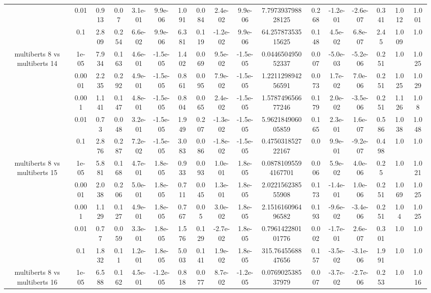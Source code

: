 \begin{tabular}{|c|c|c|c|c|c|c|c|c|c|c|c|c|c|c|c|c|}
 & 0.01 & 0.913 & 0.07 & 3.1e-01 & 9.9e-06 & 1.091 & 0.084 & 2.4e-02 & 9.9e-06 & 7.797393798828125 & 0.268 & -1.2e-01 & -2.6e-07 & 0.341 & 1.012 & 1.001 \\
 & 0.1 & 2.809 & 0.254 & 6.6e-02 & 9.9e-06 & 6.381 & 0.119 & -1.2e-02 & 9.9e-06 & 64.25787353515625 & 0.148 & 4.5e-02 & 6.8e-07 & 2.45 & 1.009 & 1.0 \\
\hline
\multirow{5}{*}{multiberts 8 vs multiberts 14} & 1e-05 & 7.934 & 0.163 & 4.6e-01 & -1.5e-05 & 1.402 & 0.069 & 9.5e-02 & -1.5e-05 & 0.044650495052337 & 0.007 & -5.0e-03 & -5.2e-06 & 0.251 & 1.0 & 1.025 \\
 & 0.0001 & 2.235 & 0.292 & 4.9e-01 & -1.5e-05 & 0.861 & 0.095 & 7.9e-02 & -1.5e-05 & 1.221129894256591 & 0.073 & 1.7e-02 & 7.0e-06 & 0.251 & 1.025 & 1.029 \\
 & 0.001 & 1.141 & 0.147 & 4.8e-01 & -1.5e-05 & 0.804 & 0.065 & 2.4e-02 & -1.5e-05 & 1.578749656677246 & 0.179 & 2.0e-02 & -3.5e-06 & 0.251 & 1.126 & 1.08 \\
 & 0.01 & 0.73 & 0.048 & 3.2e-01 & -1.5e-05 & 1.949 & 0.207 & -1.3e-02 & -1.5e-05 & 5.962184906005859 & 0.165 & 2.3e-01 & 1.6e-07 & 0.586 & 1.038 & 1.048 \\
 & 0.1 & 2.876 & 0.287 & 7.2e-02 & -1.5e-05 & 3.083 & 0.086 & -1.8e-02 & -1.5e-05 & 0.475031852722167 & 0.0 & 9.9e-01 & -9.2e-07 & 0.498 & 1.0 & 1.0 \\
\hline
\multirow{5}{*}{multiberts 8 vs multiberts 15} & 1e-05 & 5.881 & 0.168 & 4.7e-01 & 1.8e-05 & 0.933 & 0.093 & 1.0e-01 & 1.8e-05 & 0.08781095594167701 & 0.006 & 5.9e-02 & 4.0e-06 & 0.25 & 1.0 & 1.021 \\
 & 0.0001 & 2.038 & 0.206 & 5.0e-01 & 1.8e-05 & 0.711 & 0.045 & 1.3e-01 & 1.8e-05 & 2.022156238555908 & 0.173 & -1.4e-01 & 1.0e-06 & 0.251 & 1.069 & 1.025 \\
 & 0.001 & 1.129 & 0.127 & 4.9e-01 & 1.8e-05 & 0.767 & 0.05 & 3.0e-02 & 1.8e-05 & 2.151616096496582 & 0.193 & -9.6e-02 & -3.4e-06 & 0.251 & 1.04 & 1.025 \\
 & 0.01 & 0.77 & 0.059 & 3.3e-01 & 1.8e-05 & 1.576 & 0.129 & -2.7e-02 & 1.8e-05 & 0.796142280101776 & 0.002 & -1.7e-01 & 2.6e-07 & 0.301 & 1.0 & 1.0 \\
 & 0.1 & 1.832 & 0.11 & 1.2e-01 & 1.8e-05 & 5.003 & 0.141 & 1.9e-02 & 1.8e-05 & 315.7645568847656 & 0.157 & -3.5e-02 & -3.1e-06 & 1.991 & 1.0 & 1.0 \\
\hline
\multirow{5}{*}{multiberts 8 vs multiberts 16} & 1e-05 & 6.588 & 0.162 & 4.5e-01 & -1.2e-05 & 0.818 & 0.077 & 8.7e-02 & -1.2e-05 & 0.076902538537979 & 0.007 & -3.7e-02 & -2.7e-06 & 0.253 & 1.0 & 1.016 \\

\end{tabular}
